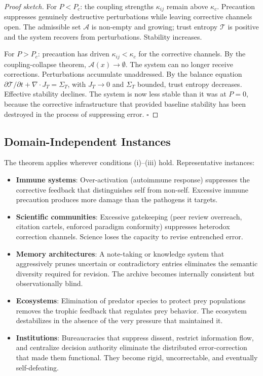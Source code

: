 \documentclass[11pt,a4paper]{article}
\theoremstyle{definition}
\theoremstyle{plain}
\begin{document}
\begin{proof}[Proof sketch]
For $P < P_c$: the coupling strengths $\kappa_{ij}$ remain above $\kappa_c$. Precaution suppresses genuinely destructive perturbations while leaving corrective channels open. The admissible set $\mathcal{A}$ is non-empty and growing; trust entropy $\mathcal{T}$ is positive and the system recovers from perturbations. Stability increases.

For $P > P_c$: precaution has driven $\kappa_{ij} < \kappa_c$ for the corrective channels. By the coupling-collapse theorem, $\mathcal{A}(x) \to \emptyset$. The system can no longer receive corrections. Perturbations accumulate unaddressed. By the balance equation $\partial\mathcal{T}/\partial t + \nabla \cdot J_T = \Sigma_T$, with $J_T \to 0$ and $\Sigma_T$ bounded, trust entropy decreases. Effective stability declines. The system is now less stable than it was at $P = 0$, because the corrective infrastructure that provided baseline stability has been destroyed in the process of suppressing error. $\square$
\end{proof}

\subsection{Domain-Independent Instances}

The theorem applies wherever conditions (i)--(iii) hold. Representative instances:

\begin{itemize}
\item \textbf{Immune systems}: Over-activation (autoimmune response) suppresses the corrective feedback that distinguishes self from non-self. Excessive immune precaution produces more damage than the pathogens it targets.
\item \textbf{Scientific communities}: Excessive gatekeeping (peer review overreach, citation cartels, enforced paradigm conformity) suppresses heterodox correction channels. Science loses the capacity to revise entrenched error.
\item \textbf{Memory architectures}: A note-taking or knowledge system that aggressively prunes uncertain or contradictory entries eliminates the semantic diversity required for revision. The archive becomes internally consistent but observationally blind.
\item \textbf{Ecosystems}: Elimination of predator species to protect prey populations removes the trophic feedback that regulates prey behavior. The ecosystem destabilizes in the absence of the very pressure that maintained it.
\item \textbf{Institutions}: Bureaucracies that suppress dissent, restrict information flow, and centralize decision authority eliminate the distributed error-correction that made them functional. They become rigid, uncorrectable, and eventually self-defeating.
\end{itemize}
\end{document}
